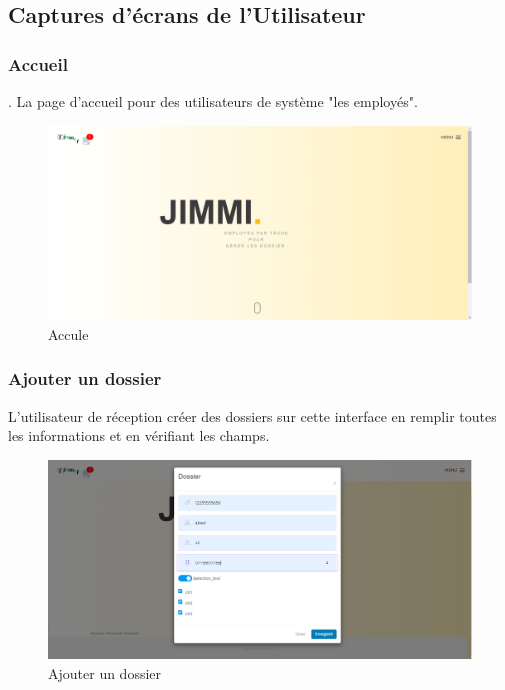  

 \subsection{Captures d'écrans de l'Utilisateur }
\subsubsection{ Accueil  }.
La page d'accueil pour des utilisateurs de système "les employés".
\begin{figure}
	\centering
	\includegraphics[width=1\linewidth]{images/captures/capturesuser/home}
	\caption{Accule}
	\label{fig:home}
\end{figure} 




\subsubsection{Ajouter un dossier}
L'utilisateur de réception créer des dossiers sur cette interface en remplir toutes les informations et en vérifiant les champs.
\begin{figure}[H]
	\centering
	\includegraphics[width=1\linewidth]{images/captures/capturesuser/adddossier}
	\caption{Ajouter un dossier}
	\label{fig:adddossier}
\end{figure}



